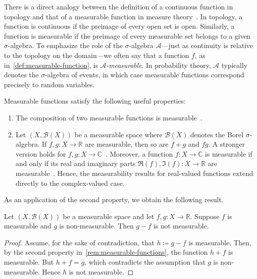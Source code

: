There is a direct analogy between the definition of a continuous function in topology and that of a measurable function in measure theory~\cite[Cor.~2.2]{FollandRealAnalysis}. In topology, a function is continuous if the preimage of every open set is open. Similarly, a function is measurable if the preimage of every measurable set belongs to a given $\sigma$-algebra. To emphasize the role of the $\sigma$-algebra $\mathcal{A}$—just as continuity is relative to the topology on the domain—we often say that a function $f$, as in~\ref{def:measurable-function}, is \emph{$\mathcal{A}$-measurable}. In probability theory, $\mathcal{A}$ typically denotes the $\sigma$-algebra of events, in which case measurable functions correspond precisely to random variables.

\begin{remarknl}
    \label{rem:measurable-functions}
    Measurable functions satisfy the following useful properties:
    \begin{enumerate}
        \item The composition of two measurable functions is measurable~\cite[Prop.~1.9]{MeasureTheoryCohn}.
        \item Let $(X, \mathcal{B}(X))$ be a measurable space where $\mathcal{B}(X)$ denotes the Borel $\sigma$-algebra. If $f, g : X \to \mathbb{R}$ are measurable, then so are $f+g$ and $fg$. A stronger version holds for $f, g : X \to \mathbb{C}$~\cite[Prop.~2.6]{FollandRealAnalysis}. Moreover, a function $f : X \to \mathbb{C}$ is measurable if and only if its real and imaginary parts $\Re(f), \Im(f) : X \to \mathbb{R}$ are measurable~\cite[Cor.~2.5]{FollandRealAnalysis}. Hence, the measurability results for real-valued functions extend directly to the complex-valued case.
    \end{enumerate}
\end{remarknl}

As an application of the second property, we obtain the following result.

\begin{corollary}
    Let $(X, \mathcal{B}(X))$ be a measurable space and let $f, g : X \to \mathbb{R}$. Suppose $f$ is measurable and $g$ is non-measurable. Then $g-f$ is not measurable.
\end{corollary}

\begin{proof}

    Assume, for the sake of contradiction, that $h \coloneq g - f$ is measurable. Then, by the second property in~\ref{rem:measurable-functions}, the function $h+f$ is measurable. But $h+f = g$, which contradicts the assumption that $g$ is non-measurable. Hence $h$ is not measurable.
\end{proof}

